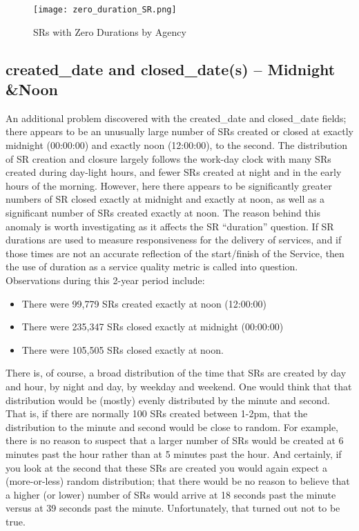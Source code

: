 \documentclass[12pt, titlepage]{article}
\begin{document}
	\begin{figure}[H]
		 \centering
		 \texttt{[image: zero\_duration\_SR.png]}
		 \caption{SRs with Zero Durations by Agency}
		 \label{fig:sero-duration}
	\end{figure}	
		
	\subsection{created\_date and closed\_date(s) -- Midnight \&Noon}
	An additional problem discovered with the created\_date and closed\_date fields; there appears to be an unusually large number of 
	SRs created or closed at exactly midnight (00:00:00) and exactly noon (12:00:00), to the second. The distribution of SR creation and closure 
	largely follows the work-day clock with many SRs created during day-light hours, and fewer SRs 
	created at night and in the early hours of the morning. 
	However, here there appears to be significantly greater numbers of SR closed exactly at midnight and exactly at noon,
	as well as a significant number of SRs created exactly at noon. The reason behind this anomaly is worth investigating 
	as it affects the SR ``duration'' question. If SR durations are used to measure responsiveness
	for the delivery of services, and if those times are not an accurate reflection of the start/finish of the Service, then the use of
	duration as a service quality metric is called into question. Observations during this 2-year period include:
	
	\begin{itemize}
		    \item There were 99,779 SRs created exactly at noon (12:00:00)
		    \item There were 235,347 SRs closed exactly at midnight (00:00:00)
		    \item There were 105,505 SRs closed exactly at noon. 
	\end{itemize}
	
	There is, of course, a broad distribution of the time that SRs are created by day and hour, by night and day, by weekday and weekend. 
	One would think that that distribution would be (mostly) evenly distributed by the minute and second. That is, 
	if there are normally 100 SRs created between 1-2pm, that the distribution to the minute and second 
	would be close to random. For example, there is no reason to suspect that a larger number of SRs would be 
	created at 6 minutes past the hour rather than at 5 minutes past the hour. And certainly, if you look at the second that these SRs
	are created you would again expect a (more-or-less) random distribution; that there would be no reason to believe 
	that a higher (or lower) number of SRs would arrive at 18 seconds past the minute versus at 39 seconds past the minute.
	Unfortunately, that turned out not to be true.
	
\end{document}
